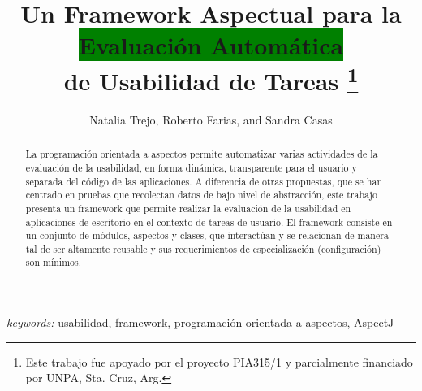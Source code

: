 \documentclass{llncs}
\begin{document}

\title{Un Framework Aspectual para la \colorbox{green}{Evaluación Automática} \\ de Usabilidad de Tareas
\thanks{Este trabajo fue apoyado por el proyecto PIA315/1 y parcialmente financiado por UNPA, Sta. Cruz, Arg.}}


\author{
Natalia Trejo, 
 Roberto Farias, and
 Sandra Casas    
}







\maketitle


\begin{abstract}
La programación orientada a aspectos permite automatizar varias actividades de la evaluación de la usabilidad, en forma dinámica, transparente para el usuario y separada del código de las aplicaciones. A diferencia de otras propuestas, que se han centrado en pruebas que recolectan datos de bajo nivel de abstracción, este trabajo presenta un framework que permite realizar la evaluación de la usabilidad en aplicaciones de escritorio en el contexto de tareas de usuario. El framework consiste en un conjunto de módulos, aspectos y clases, que interactúan y se relacionan de manera tal de ser altamente reusable y sus requerimientos de especialización (configuración) son mínimos. 
\end{abstract}
{\em keywords:} usabilidad, framework, programación orientada a aspectos, AspectJ















\end{document}
